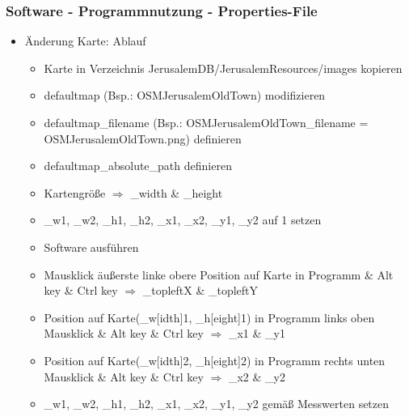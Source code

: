 \documentclass{beamer}
\begin{document}
	\begin{frame}
			\frametitle{Software - Programmnutzung - Properties-File} 
				\begin{itemize}	
					\item Änderung Karte: Ablauf
					\begin{itemize}
						\item Karte in Verzeichnis JerusalemDB/JerusalemResources/images kopieren
						\item defaultmap (Bsp.: OSMJerusalemOldTown) modifizieren
						\item defaultmap\_filename (Bsp.: OSMJerusalemOldTown\_filename = OSMJerusalemOldTown.png) definieren
						\item defaultmap\_absolute\_path definieren
						\item Kartengröße $\Rightarrow$ \_width \& \_height
						\item \_w1, \_w2, \_h1, \_h2, \_x1, \_x2, \_y1, \_y2 auf 1 setzen
						\item Software ausführen
						\item Mausklick äußerste linke obere Position auf Karte in Programm  \& Alt key \& Ctrl key $\Rightarrow$ \_topleftX \& \_topleftY
						\item Position auf Karte(\_w[idth]1, \_h[eight]1) in Programm links oben Mausklick \& Alt key \& Ctrl key $\Rightarrow$ \_x1 \& \_y1
								\item Position auf Karte(\_w[idth]2, \_h[eight]2) in Programm rechts unten Mausklick \& Alt key \& Ctrl key $\Rightarrow$ \_x2 \& \_y2
						\item \_w1, \_w2, \_h1, \_h2, \_x1, \_x2, \_y1, \_y2 gemäß Messwerten setzen
					\end{itemize}
				\end{itemize}
	\end{frame}		
\end{document}
